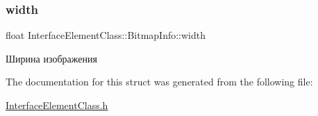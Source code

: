 \subsubsection{\texorpdfstring{width}{width}}
{\footnotesize\ttfamily float Interface\+Element\+Class\+::\+Bitmap\+Info\+::width}



Ширина изображения 



The documentation for this struct was generated from the following file\+:\begin{DoxyCompactItemize}
\item 
\hyperlink{_interface_element_class_8h}{Interface\+Element\+Class.\+h}\end{DoxyCompactItemize}
